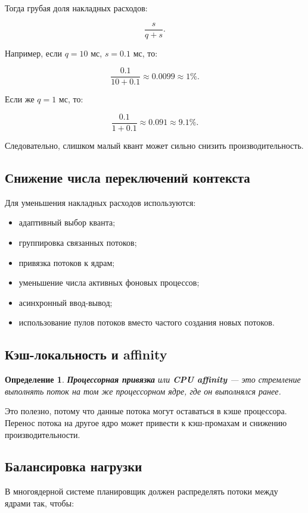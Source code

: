 \documentclass[12pt,a4paper]{article}
\newtheorem{definition}{Определение}
\begin{document}
Тогда грубая доля накладных расходов:

\[
\frac{s}{q+s}.
\]

Например, если $q = 10$ мс, $s = 0.1$ мс, то:

\[
\frac{0.1}{10 + 0.1} \approx 0.0099 \approx 1\%.
\]

Если же $q = 1$ мс, то:

\[
\frac{0.1}{1 + 0.1} \approx 0.091 \approx 9.1\%.
\]

Следовательно, слишком малый квант может сильно снизить производительность.

\subsection{Снижение числа переключений контекста}

Для уменьшения накладных расходов используются:

\begin{itemize}
    \item адаптивный выбор кванта;
    \item группировка связанных потоков;
    \item привязка потоков к ядрам;
    \item уменьшение числа активных фоновых процессов;
    \item асинхронный ввод-вывод;
    \item использование пулов потоков вместо частого создания новых потоков.
\end{itemize}

\subsection{Кэш-локальность и affinity}

\begin{definition}
\textbf{Процессорная привязка} или \textbf{CPU affinity} --- это стремление выполнять поток на том же процессорном ядре, где он выполнялся ранее.
\end{definition}

Это полезно, потому что данные потока могут оставаться в кэше процессора. Перенос потока на другое ядро может привести к кэш-промахам и снижению производительности.

\subsection{Балансировка нагрузки}

В многоядерной системе планировщик должен распределять потоки между ядрами так, чтобы:
\end{document}
